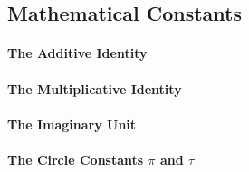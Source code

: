 


\subsection{Mathematical Constants}





\paragraph{The Additive Identity} 

\paragraph{The Multiplicative Identity} 

\paragraph{The Imaginary Unit}

\paragraph{The Circle Constants $\pi$ and $\tau$}


